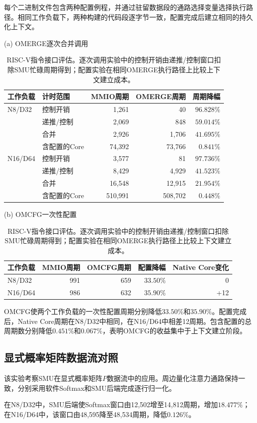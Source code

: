 \documentclass[journal]{IEEEtran}
\begin{document}
每个二进制文件包含两种配置例程，并通过驻留数据段的通路选择变量选择执行路径。相同工作负载下，两种构建的代码段逐字节一致，配置完成后建立相同的持久化上下文。
\begin{table}[t]\centering\small
\caption{RISC-V指令接口评估。逐次调用实验中的控制开销由递推/控制窗口扣除SMU忙碌周期得到；配置实验在相同OMERGE执行路径上比较上下文建立成本。}
\label{tab:interface}
(a) OMERGE逐次合并调用\par\medskip
\begin{tabular}{llrrr}
\toprule
工作负载 & 计时范围 & MMIO周期 & OMERGE周期 & 周期降幅\\
\midrule
N8/D32 & 控制开销 & 1,261 & 40 & $96.828\%$\\
 & 递推/控制 & 2,069 & 848 & $59.014\%$\\
 & 合并 & 2,926 & 1,706 & $41.695\%$\\
 & 含配置的Core & 74,392 & 73,766 & $0.841\%$\\
N16/D64 & 控制开销 & 3,577 & 81 & $97.736\%$\\
 & 递推/控制 & 8,429 & 4,929 & $41.523\%$\\
 & 合并 & 16,548 & 12,915 & $21.954\%$\\
 & 含配置的Core & 510,991 & 508,702 & $0.448\%$\\
\bottomrule
\end{tabular}\par\medskip
(b) OMCFG一次性配置\par\medskip
\begin{tabular}{lrrrr}
\toprule
工作负载 & MMIO周期 & OMCFG周期 & 配置降幅 & Native Core变化\\
\midrule
N8/D32 & 991 & 659 & $33.50\%$ & 0\\
N16/D64 & 986 & 632 & $35.90\%$ & +12\\
\bottomrule
\end{tabular}
\end{table}
OMCFG使两个工作负载的一次性配置周期分别降低$33.50\%$和$35.90\%$。配置完成后，Native Core周期在N8/D32中相同，在N16/D64中相差12周期。包含配置的总周期数分别降低$0.451\%$和$0.067\%$，表明OMCFG的收益集中于上下文建立阶段。

\subsection{显式概率矩阵数据流对照}
该实验考察SMU在显式概率矩阵$P$数据流中的应用。周边量化注意力通路保持一致，分别采用软件Softmax和SMU后端完成逐行归一化。

在N8/D32中，SMU后端使Softmax窗口由12,502增至14,812周期，增加$18.477\%$；在N16/D64中，该窗口由48,595降至48,534周期，降低$0.126\%$。
\end{document}
